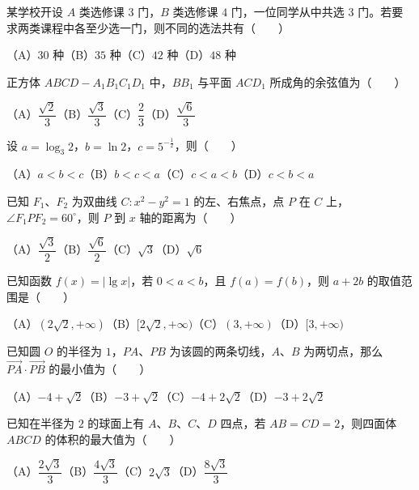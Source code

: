 \begin{question}
某学校开设 $A$ 类选修课 $3$ 门，$B$ 类选修课 $4$ 门，一位同学从中共选 $3$ 门。若要求两类课程中各至少选一门，则不同的选法共有\mbox{（　　）}

（A）$30$ 种\quad（B）$35$ 种\quad（C）$42$ 种\quad（D）$48$ 种

\end{question}
\begin{question}
正方体 $ABCD-A_1B_1C_1D_1$ 中，$BB_1$ 与平面 $ACD_1$ 所成角的余弦值为\mbox{（　　）}

（A）$\dfrac{\sqrt2}{3}$\quad（B）$\dfrac{\sqrt3}{3}$\quad（C）$\dfrac23$\quad（D）$\dfrac{\sqrt6}{3}$

\end{question}
\begin{question}
设 $a=\log_3 2$，$b=\ln2$，$c=5^{-\frac12}$，则\mbox{（　　）}

（A）$a<b<c$\quad（B）$b<c<a$\quad（C）$c<a<b$\quad（D）$c<b<a$

\end{question}
\begin{question}
已知 $F_1\text{、}F_2$ 为双曲线 $C:x^2-y^2=1$ 的左、右焦点，点 $P$ 在 $C$ 上，$\angle F_1PF_2=60^\circ$，则 $P$ 到 $x$ 轴的距离为\mbox{（　　）}

（A）$\dfrac{\sqrt3}{2}$\quad（B）$\dfrac{\sqrt6}{2}$\quad（C）$\sqrt3$\quad（D）$\sqrt6$

\end{question}
\begin{question}
已知函数 $f(x)=|\lg x|$，若 $0<a<b$，且 $f(a)=f(b)$，则 $a+2b$ 的取值范围是\mbox{（　　）}

（A）$(2\sqrt2,+\infty)$\quad（B）$[2\sqrt2,+\infty)$\quad（C）$(3,+\infty)$\quad（D）$[3,+\infty)$

\end{question}
\begin{question}
已知圆 $O$ 的半径为 $1$，$PA\text{、}PB$ 为该圆的两条切线，$A\text{、}B$ 为两切点，那么 $\overrightarrow{PA}\cdot\overrightarrow{PB}$ 的最小值为\mbox{（　　）}

（A）$-4+\sqrt2$\quad（B）$-3+\sqrt2$\quad（C）$-4+2\sqrt2$\quad（D）$-3+2\sqrt2$

\end{question}
\begin{question}
已知在半径为 $2$ 的球面上有 $A\text{、}B\text{、}C\text{、}D$ 四点，若 $AB=CD=2$，则四面体 $ABCD$ 的体积的最大值为\mbox{（　　）}

（A）$\dfrac{2\sqrt3}{3}$\quad（B）$\dfrac{4\sqrt3}{3}$\quad（C）$2\sqrt3$\quad（D）$\dfrac{8\sqrt3}{3}$

\end{question}

